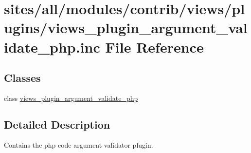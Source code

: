 \hypertarget{views__plugin__argument__validate__php_8inc}{
\section{sites/all/modules/contrib/views/plugins/views\_\-plugin\_\-argument\_\-validate\_\-php.inc File Reference}
\label{views__plugin__argument__validate__php_8inc}
}
\subsection*{Classes}
\begin{CompactItemize}
\item 
class \hyperlink{classviews__plugin__argument__validate__php}{views\_\-plugin\_\-argument\_\-validate\_\-php}
\end{CompactItemize}


\subsection{Detailed Description}
Contains the php code argument validator plugin. 